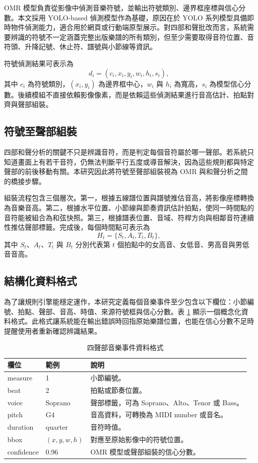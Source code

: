 \documentclass[12pt,a4paper]{article}
\begin{document}
OMR 模型負責從影像中偵測音樂符號，並輸出符號類別、邊界框座標與信心分數。本文採用 YOLO-based 偵測模型作為基礎，原因在於 YOLO 系列模型具備即時物件偵測能力，適合用於網頁或行動端原型展示。對四部和聲批改而言，系統需要辨識的符號不一定涵蓋完整出版樂譜的所有類別，但至少需要取得音符位置、音符頭、升降記號、休止符、譜號與小節線等資訊。

符號偵測結果可表示為
\[
  d_i = (c_i, x_i, y_i, w_i, h_i, s_i),
\]
其中 $c_i$ 為符號類別，$(x_i,y_i)$ 為邊界框中心，$w_i$ 與 $h_i$ 為寬高，$s_i$ 為模型信心分數。後續模組不直接依賴影像像素，而是依賴這些偵測結果進行音高估計、拍點對齊與聲部組裝。

\subsection{符號至聲部組裝}

四部和聲分析的關鍵不只是辨識音符，而是判定每個音符屬於哪一聲部。若系統只知道畫面上有若干音符，仍無法判斷平行五度或導音解決，因為這些規則都與特定聲部的前後移動有關。本研究因此將符號至聲部組裝視為 OMR 與和聲分析之間的橋接步驟。

組裝流程包含三個層次。第一，根據五線譜位置與譜號推估音高，將影像座標轉換為音樂音高。第二，根據水平位置、小節線與節奏資訊估計拍點，使同一時間點的音符能被組合為和弦快照。第三，根據譜表位置、音域、符桿方向與相鄰音符連續性推估聲部標籤。完成後，每個時間點可表示為
\[
  H_t = \{S_t, A_t, T_t, B_t\},
\]
其中 $S_t$、$A_t$、$T_t$ 與 $B_t$ 分別代表第 $t$ 個拍點中的女高音、女低音、男高音與男低音音高。

\subsection{結構化資料格式}

為了讓規則引擎能穩定運作，本研究定義每個音樂事件至少包含以下欄位：小節編號、拍點、聲部、音高、時值、來源符號框與信心分數。表 \ref{tab:data} 顯示一個概念化資料格式。此格式讓系統能在輸出錯誤時回指原始樂譜位置，也能在信心分數不足時提醒使用者重新確認辨識結果。

\begin{table}[htbp]
  \centering
  \caption{四聲部音樂事件資料格式}
  \label{tab:data}
  \begin{tabular}{p{2.6cm}p{3.2cm}p{7.4cm}}
    \toprule
    欄位 & 範例 & 說明 \\
    \midrule
    measure & 1 & 小節編號。 \\
    beat & 2 & 拍點或節奏位置。 \\
    voice & Soprano & 聲部標籤，可為 Soprano、Alto、Tenor 或 Bass。 \\
    pitch & G4 & 音高資料，可轉換為 MIDI number 或音名。 \\
    duration & quarter & 音符時值。 \\
    bbox & $(x,y,w,h)$ & 對應至原始影像中的符號位置。 \\
    confidence & 0.96 & OMR 模型或聲部組裝的信心分數。 \\
    \bottomrule
  \end{tabular}
\end{table}
\end{document}
